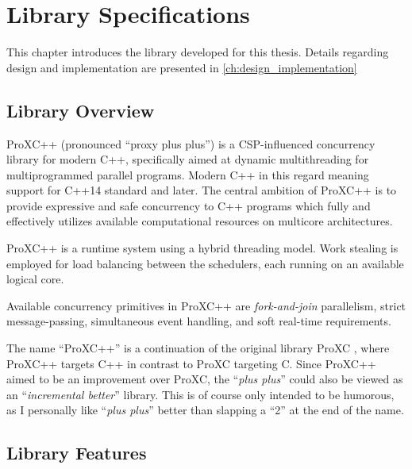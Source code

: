 
\chapter{Library Specifications}
\label{ch:proxc_library}

This chapter introduces the library developed for this thesis. Details regarding design and implementation are presented in \cref{ch:design_implementation}


\section{Library Overview}
\label{sec:library_overview}

ProXC++ (pronounced ``proxy plus plus'') is a CSP\hyp{}influenced concurrency library for modern C++, specifically aimed at dynamic multithreading for multiprogrammed parallel programs. Modern C++ in this regard meaning support for C++14 standard and later. The central ambition of ProXC++ is to provide expressive and safe concurrency to C++ programs which fully and effectively utilizes available computational resources on multicore architectures.

ProXC++ is a runtime system using a hybrid threading model. Work stealing is employed for load balancing between the schedulers, each running on an available logical core. 

Available concurrency primitives in ProXC++ are \textit{fork\hyp{}and\hyp{}join} parallelism, strict message\hyp{}passing, simultaneous event handling, and soft real\hyp{}time requirements.

The name ``ProXC++'' is a continuation of the original library ProXC \citep{pettersen2016proxc}, where ProXC++ targets C++ in contrast to ProXC targeting C. Since ProXC++ aimed to be an improvement over ProXC, the ``\textit{plus plus}'' could also be viewed as an ``\textit{incremental better}'' library. This is of course only intended to be humorous, as I personally like ``\textit{plus plus}'' better than slapping a ``2'' at the end of the name.


\section{Library Features}
\label{sec:library_features}

